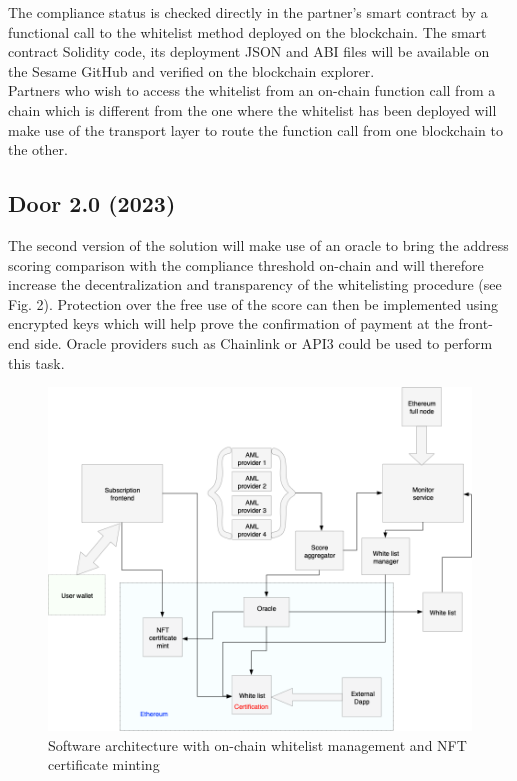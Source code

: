﻿\documentclass[a4paper]{article}
\begin{document}
The compliance status is checked directly in the partner's smart contract by a functional call to the whitelist method deployed on the blockchain. The smart contract Solidity code, its deployment JSON and ABI files will be available on the Sesame GitHub and verified on the blockchain explorer. \\

Partners who wish to access the whitelist from an on-chain function call from a chain which is different from the one where the whitelist has been deployed will make use of the transport layer to route the function call from one blockchain to the other.
\subsection{Door 2.0 (2023)}
The second version of the solution will make use of an oracle to bring the address scoring comparison with the compliance threshold on-chain and will therefore increase the decentralization and transparency of the whitelisting procedure (see Fig. 2). Protection over the free use of the score can then be implemented using encrypted keys which will help prove the confirmation of payment at the front-end side. Oracle providers such as Chainlink or API3 could be used to perform this task. \\  

\begin{figure}[!h]
\centering
\includegraphics[scale=0.35]{architecture_v2_trim.png}
\caption{Software architecture with on-chain whitelist management and NFT certificate minting}
\label{onchain}
\end{figure}
\end{document}
